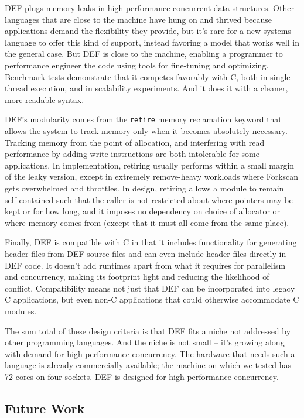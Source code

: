 DEF plugs memory leaks in high-performance concurrent data structures.  Other languages that are close to the machine have hung on and thrived because applications demand the flexibility they provide, but it's rare for a new systems language to offer this kind of support, instead favoring a model that works well in the general case.  But DEF is close to the machine, enabling a programmer to performance engineer the code using tools for fine-tuning and optimizing.  Benchmark tests demonstrate that it competes favorably with C, both in single thread execution, and in scalability experiments.  And it does it with a cleaner, more readable syntax.

DEF's modularity comes from the \texttt{retire} memory reclamation keyword that allows the system to track memory only when it becomes absolutely necessary.  Tracking memory from the point of allocation, and interfering with read performance by adding write instructions are both intolerable for some applications.  In implementation, retiring usually performs within a small margin of the leaky version, except in extremely remove-heavy workloads where Forkscan gets overwhelmed and throttles.  In design, retiring allows a module to remain self-contained such that the caller is not restricted about where pointers may be kept or for how long, and it imposes no dependency on choice of allocator or where memory comes from (except that it must all come from the same place).

Finally, DEF is compatible with C in that it includes functionality for generating header files from DEF source files and can even include header files directly in DEF code.  It doesn't add runtimes apart from what it requires for parallelism and concurrency, making its footprint light and reducing the likelihood of conflict.  Compatibility means not just that DEF can be incorporated into legacy C applications, but even non-C applications that could otherwise accommodate C modules.

The sum total of these design criteria is that DEF fits a niche not addressed by other programming languages.  And the niche is not small -- it's growing along with demand for high-performance concurrency.  The hardware that needs such a language is already commercially available; the machine on which we tested has 72 cores on four sockets.  DEF is designed for high-performance concurrency.

\subsection{Future Work}

